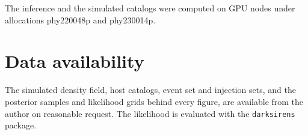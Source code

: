 \documentclass[twocolumn]{aastex631}
\begin{document}







\begin{acknowledgments}
The inference and the simulated catalogs were computed on GPU nodes under
allocations phy220048p and phy230014p.
\end{acknowledgments}

\section*{Data availability}

The simulated density field, host catalogs, event set and injection sets, and
the posterior samples and likelihood grids behind every figure, are available
from the author on reasonable request. The likelihood is evaluated with the
\texttt{darksirens} package.





\end{document}
